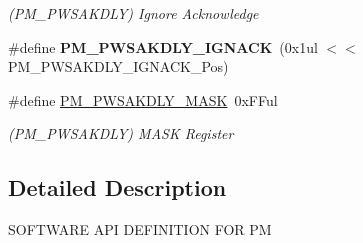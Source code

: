 \begin{DoxyCompactItemize}
\begin{DoxyCompactList}\small\item\em (P\+M\+\_\+\+P\+W\+S\+A\+K\+D\+L\+Y) Ignore Acknowledge \end{DoxyCompactList}\item 
\hypertarget{group___s_a_m_l21___p_m_gab1af84adcc08e34ef6d77a701f12c72d}{}\#define {\bfseries P\+M\+\_\+\+P\+W\+S\+A\+K\+D\+L\+Y\+\_\+\+I\+G\+N\+A\+C\+K}~(0x1ul $<$$<$ P\+M\+\_\+\+P\+W\+S\+A\+K\+D\+L\+Y\+\_\+\+I\+G\+N\+A\+C\+K\+\_\+\+Pos)\label{group___s_a_m_l21___p_m_gab1af84adcc08e34ef6d77a701f12c72d}

\item 
\hypertarget{group___s_a_m_l21___p_m_gab5db0ec95c8f83c78fe258c4747a83cc}{}\#define \hyperlink{group___s_a_m_l21___p_m_gab5db0ec95c8f83c78fe258c4747a83cc}{P\+M\+\_\+\+P\+W\+S\+A\+K\+D\+L\+Y\+\_\+\+M\+A\+S\+K}~0x\+F\+Ful\label{group___s_a_m_l21___p_m_gab5db0ec95c8f83c78fe258c4747a83cc}

\begin{DoxyCompactList}\small\item\em (P\+M\+\_\+\+P\+W\+S\+A\+K\+D\+L\+Y) M\+A\+S\+K Register \end{DoxyCompactList}\end{DoxyCompactItemize}


\subsection{Detailed Description}
S\+O\+F\+T\+W\+A\+R\+E A\+P\+I D\+E\+F\+I\+N\+I\+T\+I\+O\+N F\+O\+R P\+M 